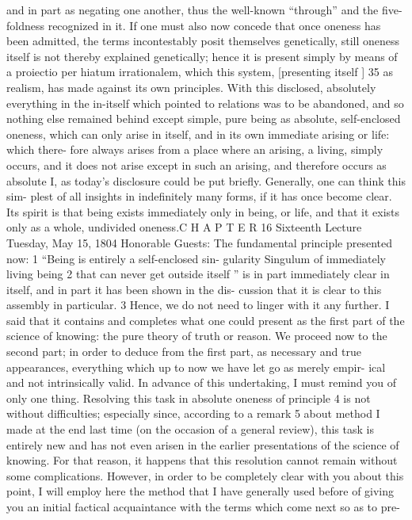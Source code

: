 and in part as negating one another, thus the well-known “through” and the
five-foldness recognized in it. If one must also now concede that once oneness
has been admitted, the terms incontestably posit themselves genetically, still
oneness itself is not thereby explained genetically; hence it is present simply
by means of a proiectio per hiatum irrationalem, which this system, [presenting
itself ] 35 as realism, has made against its own principles.
With this disclosed, absolutely everything in the in-itself which
pointed to relations was to be abandoned, and so nothing else remained
behind except simple, pure being as absolute, self-enclosed oneness, which
can only arise in itself, and in its own immediate arising or life: which there-
fore always arises from a place where an arising, a living, simply occurs, and
it does not arise except in such an arising, and therefore occurs as absolute I,
as today’s disclosure could be put briefly. Generally, one can think this sim-
plest of all insights in indefinitely many forms, if it has once become clear. Its
spirit is that being exists immediately only in being, or life, and that it exists
only as a whole, undivided oneness.C H A P T E R
16
Sixteenth Lecture
Tuesday, May 15, 1804
Honorable Guests:
The fundamental principle presented now: 1 “Being is entirely a self-enclosed sin-
gularity {Singulum} of immediately living being 2 that can never get outside itself ”
is in part immediately clear in itself, and in part it has been shown in the dis-
cussion that it is clear to this assembly in particular. 3 Hence, we do not need
to linger with it any further.
I said that it contains and completes what one could present as the first
part of the science of knowing: the pure theory of truth or reason. We proceed
now to the second part; in order to deduce from the first part, as necessary and
true appearances, everything which up to now we have let go as merely empir-
ical and not intrinsically valid. In advance of this undertaking, I must remind
you of only one thing. Resolving this task in absolute oneness of principle 4 is not
without difficulties; especially since, according to a remark 5 about method I
made at the end last time (on the occasion of a general review), this task is
entirely new and has not even arisen in the earlier presentations of the science
of knowing. For that reason, it happens that this resolution cannot remain
without some complications.
However, in order to be completely clear with you about this point, I
will employ here the method that I have generally used before of giving you
an initial factical acquaintance with the terms which come next so as to pre-
